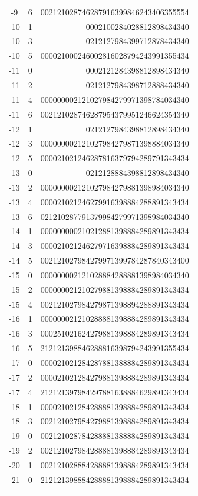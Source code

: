 \documentclass{article}
\begin{document}
\begin{supertabular}[h]{c c r}
-9    & 6  & 002121028746287916399846243406355554  \\
-10   & 1  & 0002100284028812898434340             \\
-10   & 3  & 0212127984399712878434340             \\
-10   & 5  & 000021000246002816028794243991355434  \\
-11   & 0  & 0002121284398812898434340             \\
-11   & 2  & 0212127984398712888434340             \\
-11   & 4  & 000000002121027984279971398784034340  \\
-11   & 6  & 002121028746287954379951246624354340  \\
-12   & 1  & 0212127984398812898434340             \\
-12   & 3  & 000000002121027984279871398884034340  \\
-12   & 5  & 000021021246287816379794289791343434  \\
-13   & 0  & 0212128884398812898434340             \\
-13   & 2  & 000000002121027984279881398984034340  \\
-13   & 4  & 000021021246279916398884288891343434  \\
-13   & 6  & 021210287791379984279971398984034340  \\
-14   & 1  & 000000000210212881398884289891343434  \\
-14   & 3  & 000021021246279716398884289891343434  \\
-14   & 5  & 002121027984279971399784287840343400  \\
-15   & 0  & 000000002121028884288881398984034340  \\
-15   & 2  & 000000021210279881398884289891343434  \\
-15   & 4  & 002121027984279871398894288891343434  \\
-16   & 1  & 000000021210288881398884289891343434  \\
-16   & 3  & 000251021624279881398884289891343434  \\
-16   & 5  & 212121398846288816398794243991355434  \\
-17   & 0  & 000021021284287881388884289891343434  \\
-17   & 2  & 000021021284279881398884289891343434  \\
-17   & 4  & 212121397984297881638884629891343434  \\
-18   & 1  & 000021021284288881398884289891343434  \\
-18   & 3  & 002121027984279881398884289891343434  \\
-19   & 0  & 002121028784288881388884289891343434  \\
-19   & 2  & 002121027984288881398884289891343434  \\
-20   & 1  & 002121028884288881398884289891343434  \\
-21   & 0  & 212121398884288881398884289891343434  \\
\\[-5pt]


\end{supertabular}
\end{document}
